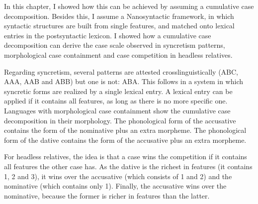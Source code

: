 In this chapter, I showed how this can be achieved by assuming a cumulative case decomposition. Besides this, I assume a Nanosyntactic framework, in which syntactic structures are built from single features, and matched onto lexical entries in the postsyntactic lexicon.
I showed how a cumulative case decomposition can derive the case scale observed in syncretism patterns, morphological case containment and case competition in headless relatives.

Regarding syncretism, several patterns are attested crosslinguistically (ABC, AAA, AAB and ABB) but one is not: ABA. This follows in a system in which syncretic forms are realized by a single lexical entry. A lexical entry can be applied if it contains all features, as long as there is no more specific one.
Languages with morphological case containment show the cumulative case decomposition in their morphology. The phonological form of the accusative contains the form of the nominative plus an extra morpheme. The phonological form of the dative contains the form of the accusative plus an extra morpheme.

For headless relatives, the idea is that a case wins the competition if it contains all features the other case has. As the dative is the richest in features (it contains 1, 2 and 3), it wins over the accusative (which consists of 1 and 2) and the nominative (which contains only 1). Finally, the accusative wins over the nominative, because the former is richer in features than the latter.
